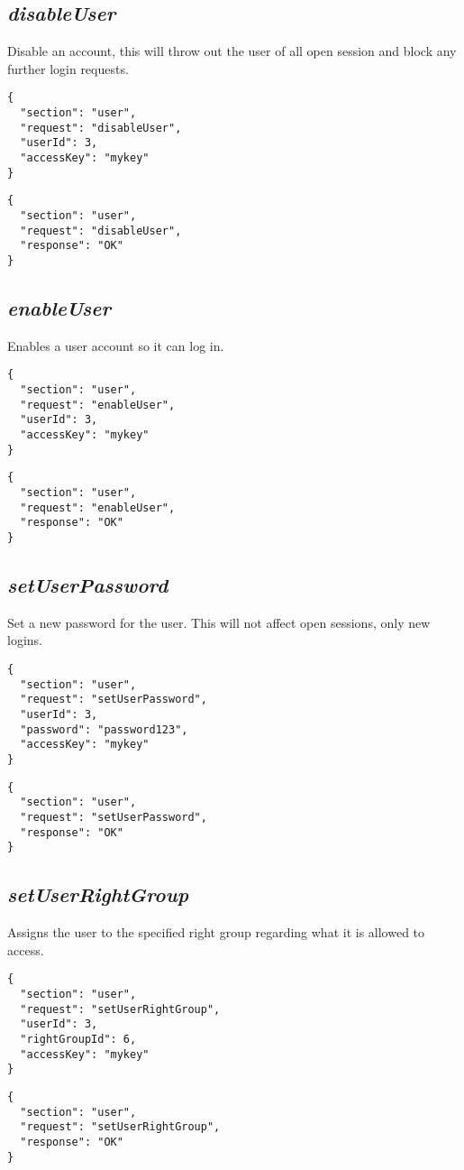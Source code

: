 \subsection*{\textit{disableUser}}
	Disable an account, this will throw out the user of all open session and block any further login requests.
	{
		\color{blue}
		\begin{verbatim}
{
  "section": "user",
  "request": "disableUser",
  "userId": 3,
  "accessKey": "mykey"
}
		\end{verbatim}
	}
	{
		\color{OliveGreen}
		\begin{verbatim}
{
  "section": "user",
  "request": "disableUser",
  "response": "OK"
}
		\end{verbatim}
	}
\subsection*{\textit{enableUser}}
	Enables a user account so it can log in.
	{
		\color{blue}
		\begin{verbatim}
{
  "section": "user",
  "request": "enableUser",
  "userId": 3,
  "accessKey": "mykey"
}
		\end{verbatim}
	}
	{
		\color{OliveGreen}
		\begin{verbatim}
{
  "section": "user",
  "request": "enableUser",
  "response": "OK"
}
		\end{verbatim}
	}
\subsection*{\textit{setUserPassword}}
	Set a new password for the user. This will not affect open sessions, only new logins.
	{
		\color{blue}
		\begin{verbatim}
{
  "section": "user",
  "request": "setUserPassword",
  "userId": 3,
  "password": "password123",
  "accessKey": "mykey"
}
		\end{verbatim}
	}
	{
		\color{OliveGreen}
		\begin{verbatim}
{
  "section": "user",
  "request": "setUserPassword",
  "response": "OK"
}
		\end{verbatim}
	}
\subsection*{\textit{setUserRightGroup}}
	Assigns the user to the specified right group regarding what it is allowed to access.
	{
		\color{blue}
		\begin{verbatim}
{
  "section": "user",
  "request": "setUserRightGroup",
  "userId": 3,
  "rightGroupId": 6,
  "accessKey": "mykey"
}
		\end{verbatim}
	}
	{
		\color{OliveGreen}
		\begin{verbatim}
{
  "section": "user",
  "request": "setUserRightGroup",
  "response": "OK"
}
		\end{verbatim}
	}



